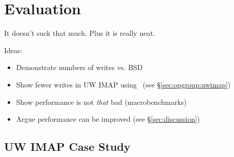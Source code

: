 \section {Evaluation}
\label{sec:evaluation}


It doesn't suck that much. Plus it is really neat.

Ideas:
\begin{itemize}
\item Demonstrate numbers of writes vs. BSD
\item Show fewer writes in UW IMAP using \opgroups\ (see \S\ref{sec:opgroup:uwimap})
\item Show performance is not \emph{that} bad (macrobenchmarks)
\item Argue performance can be improved (see \S\ref{sec:discussion})
\end{itemize}

\subsection {UW IMAP Case Study}
\label{sec:evaluation:uwimap}

